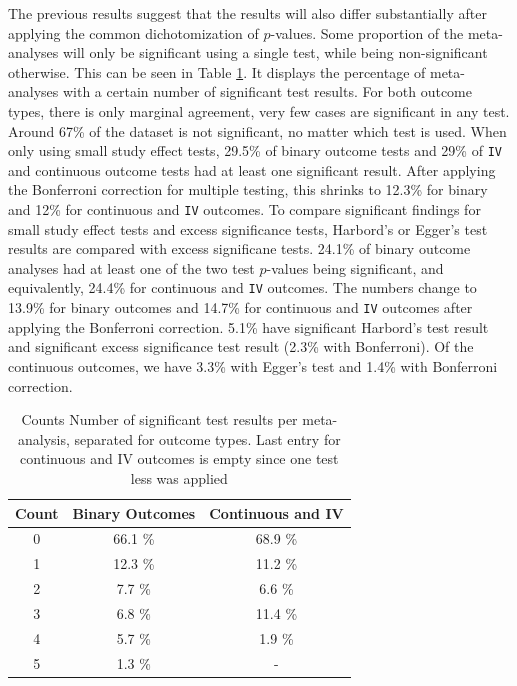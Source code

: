 \documentclass[11pt,a4paper,twoside]{book}\usepackage[]{graphicx}\usepackage[]{color}
\begin{document}
The previous results suggest that the results will also differ substantially after applying the common dichotomization of $p$-values. Some proportion of the meta-analyses will only be significant using a single test, while being non-significant otherwise. This can be seen in Table \ref{number.sig.tests}. It displays the percentage of meta-analyses with a certain number of significant test results. For both outcome types, there is only marginal agreement, very few cases are significant in any test. Around 67\% of the dataset is not significant, no matter which test is used. When only using small study effect tests, 29.5\% of binary outcome tests and 29\% of \texttt{IV} and continuous outcome tests had at least one significant result. After applying the Bonferroni correction for multiple testing, this shrinks to 12.3\% for binary and 12\% for continuous and \texttt{IV} outcomes. To compare significant findings for small study effect tests and excess significance tests, Harbord's or Egger's test results are compared with excess significane tests. 24.1\% of binary outcome analyses had at least one of the two test $p$-values being significant, and equivalently, 24.4\% for continuous and \texttt{IV} outcomes. The numbers change to 13.9\% for binary outcomes and 14.7\% for continuous and \texttt{IV} outcomes after applying the Bonferroni correction. 5.1\% have significant Harbord's test result and significant excess significance test result  (2.3\% with Bonferroni). Of the continuous outcomes, we have 3.3\% with Egger's test and 1.4\% with Bonferroni correction. \\

\begin{table}[ht]
\centering
\begingroup\footnotesize
\begin{tabular}{ccc}
  \hline
Count & Binary Outcomes & Continuous and IV \\ 
  \hline
0 & 66.1 \% & 68.9 \% \\ 
  1 & 12.3 \% & 11.2 \% \\ 
  2 & 7.7 \% & 6.6 \% \\ 
  3 & 6.8 \% & 11.4 \% \\ 
  4 & 5.7 \% & 1.9 \% \\ 
  5 & 1.3 \% & - \\ 
   \hline
\end{tabular}
\endgroup
\caption{Counts Number of significant test results per meta-analysis, separated
       for outcome types. Last entry for continuous and IV outcomes is empty since one test less was 
       applied} 
\label{number.sig.tests}
\end{table}
\end{document}

